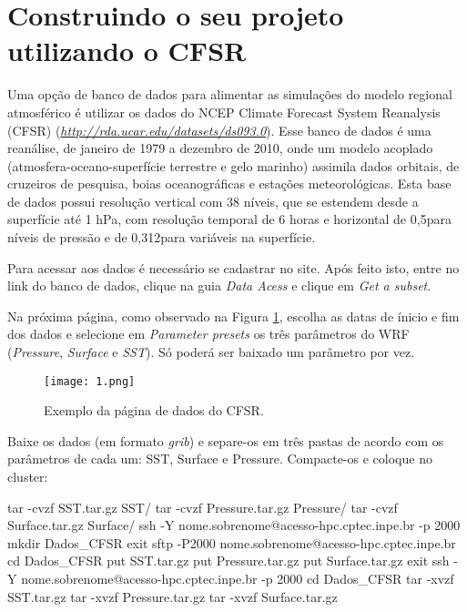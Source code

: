 \section{Construindo o seu projeto utilizando o CFSR}
\bigskip

\noindent Uma opção de banco de dados para alimentar as simulações do modelo regional atmosférico é utilizar os dados do 
          NCEP Climate Forecast System Reanalysis (CFSR) (\textcolor{bleu_cite}{\href{http://rda.ucar.edu/datasets/ds093.0}{\textit{http://rda.ucar.edu/datasets/ds093.0}}}). 
          Esse banco de dados é uma reanálise, de janeiro de 1979 a dezembro de 2010, onde um modelo acoplado (atmosfera-oceano-superfície terrestre e gelo marinho)
          assimila dados orbitais, de cruzeiros de pesquisa, boias oceanográficas e estações meteorológicas. Esta base de dados 
          possui resolução vertical com 38 níveis, que se estendem desde a superfície até 1 hPa, com resolução temporal de 6 horas
          e horizontal de 0,5\degree para níveis de pressão e de 0,312\degree para variáveis na superfície.
\bigskip

\noindent Para acessar aos dados é necessário se cadastrar no site. Após feito isto, entre no link do banco de dados, 
          clique na guia \textit{Data Acess} e clique em \textit{Get a subset}.
\bigskip

\noindent Na próxima página, como observado na Figura \textcolor{bleu_cite}{\ref{detalhacfsr}}, escolha as datas de ínicio 
          e fim dos dados e selecione em \textit{Parameter presets} os três parâmetros do WRF (\textit{Pressure}, 
          \textit{Surface} e \textit{SST}). Só poderá ser baixado um parâmetro por vez.
\bigskip

\begin{figure}[H]
    \centering
    \texttt{[image: 1.png]}
    \caption{Exemplo da página de dados do CFSR.}
    \label{detalhacfsr}
\end{figure}
\bigskip

\noindent Baixe os dados (em formato \textit{grib}) e separe-os em três pastas de acordo com os parâmetros de cada um: 
          SST, Surface e Pressure. Compacte-os e coloque no cluster:
\bigskip

\begin{bashcode}
tar -cvzf SST.tar.gz SST/
tar -cvzf Pressure.tar.gz Pressure/
tar -cvzf Surface.tar.gz Surface/
ssh -Y nome.sobrenome@acesso-hpc.cptec.inpe.br -p 2000
mkdir Dados_CFSR
exit
sftp -P2000 nome.sobrenome@acesso-hpc.cptec.inpe.br
cd Dados_CFSR
put SST.tar.gz
put Pressure.tar.gz
put Surface.tar.gz
exit
ssh -Y nome.sobrenome@acesso-hpc.cptec.inpe.br -p 2000
cd Dados_CFSR
tar -xvzf SST.tar.gz
tar -xvzf Pressure.tar.gz
tar -xvzf Surface.tar.gz
\end{bashcode}
\bigskip


